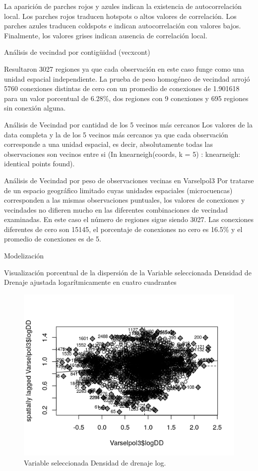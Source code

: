 \documentclass[11pt,]{article}
\begin{document}
La aparición de parches rojos y azules indican la existencia de
autocorrelación local. Los parches rojos traducen hotspots o altos
valores de correlación. Los parches azules traducen coldspots e indican
autocorrelación con valores bajos. Finalmente, los valores grises
indican ausencia de correlación local.

Análisis de vecindad por contigüidad (vecxcont)

Resultaron 3027 regiones ya que cada observación en este caso funge como
una unidad espacial independiente. La prueba de peso homogéneo de
vecindad arrojó 5760 conexiones distintas de cero con un promedio de
conexiones de 1.901618 para un valor porcentual de 6.28\%, dos regiones
con 9 conexiones y 695 regiones sin conexión alguna.

Análisis de Vecindad por cantidad de los 5 vecinos más cercanos Los
valores de la data completa y la de los 5 vecinos más cercanos ya que
cada observación corresponde a una unidad espacial, es decir,
absolutamente todas las observaciones son vecinos entre si (In
knearneigh(coords, k = 5) : knearneigh: identical points found).

Análisis de Vecindad por peso de observaciones vecinas en Varselpol3 Por
tratarse de un espacio geográfico limitado cuyas unidades espaciales
(microcuencas) corresponden a las mismas observaciones puntuales, los
valores de conexiones y vecindades no difieren mucho en las diferentes
combinaciones de vecindad examinadas. En este caso el número de regiones
sigue siendo 3027. Las conexiones diferentes de cero son 15145, el
porcentaje de conexiones no cero es 16.5\% y el promedio de conexiones
es de 5.

Modelización

Visualización porcentual de la dispersión de la Variable seleccionada
Densidad de Drenaje ajustada logarítmicamente en cuatro cuadrantes

\begin{figure}
\centering
\includegraphics{Imagenes/moranValselpol3logDD.png}
\caption{Variable seleccionada Densidad de drenaje log.}
\end{figure}
\end{document}
